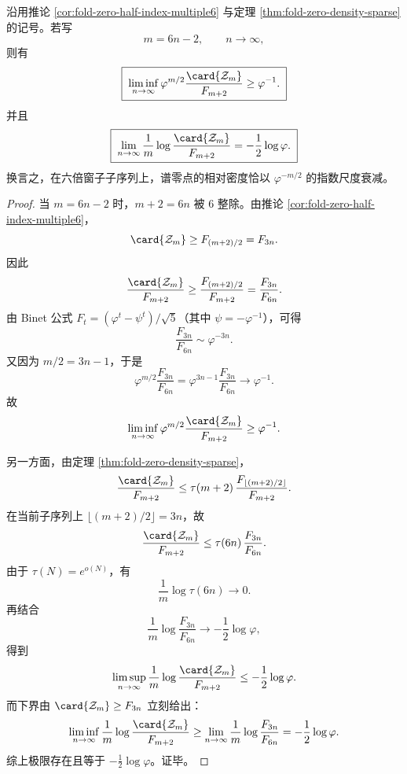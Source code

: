 \begin{theorem}[六倍窗子序列上零点集合密度的精确指数级]\label{thm:fold-zero-window6-density-sharp-exponent}
沿用推论 \ref{cor:fold-zero-half-index-multiple6} 与定理 \ref{thm:fold-zero-density-sparse} 的记号。若写
\[
m=6n-2,
\qquad n\to\infty,
\]
则有
\[
\boxed{\;
\liminf_{n\to\infty}
\varphi^{m/2}\frac{\card{\mathcal{Z}_m}}{F_{m+2}}
\ge
\varphi^{-1}.\;}
\]
并且
\[
\boxed{\;
\lim_{n\to\infty}
\frac{1}{m}\log\frac{\card{\mathcal{Z}_m}}{F_{m+2}}
=
-\frac{1}{2}\log\varphi.\;}
\]
换言之，在六倍窗子子序列上，谱零点的相对密度恰以 \(\varphi^{-m/2}\) 的指数尺度衰减。
\end{theorem}
\begin{proof}
当 \(m=6n-2\) 时，\(m+2=6n\) 被 \(6\) 整除。由推论 \ref{cor:fold-zero-half-index-multiple6}，
\[
\card{\mathcal{Z}_m}\ge F_{(m+2)/2}=F_{3n}.
\]
因此
\[
\frac{\card{\mathcal{Z}_m}}{F_{m+2}}
\ge
\frac{F_{(m+2)/2}}{F_{m+2}}
=
\frac{F_{3n}}{F_{6n}}.
\]
由 Binet 公式 \(F_t=(\varphi^t-\psi^t)/\sqrt5\)（其中 \(\psi=-\varphi^{-1}\)），可得
\[
\frac{F_{3n}}{F_{6n}}
\sim
\varphi^{-3n}.
\]
又因为 \(m/2=3n-1\)，于是
\[
\varphi^{m/2}\frac{F_{3n}}{F_{6n}}
=
\varphi^{3n-1}\frac{F_{3n}}{F_{6n}}
\longrightarrow
\varphi^{-1}.
\]
故
\[
\liminf_{n\to\infty}
\varphi^{m/2}\frac{\card{\mathcal{Z}_m}}{F_{m+2}}
\ge
\varphi^{-1}.
\]

另一方面，由定理 \ref{thm:fold-zero-density-sparse}，
\[
\frac{\card{\mathcal{Z}_m}}{F_{m+2}}
\le
\tau(m+2)\,\frac{F_{\lfloor (m+2)/2\rfloor}}{F_{m+2}}.
\]
在当前子序列上 \(\lfloor (m+2)/2\rfloor=3n\)，故
\[
\frac{\card{\mathcal{Z}_m}}{F_{m+2}}
\le
\tau(6n)\,\frac{F_{3n}}{F_{6n}}.
\]
由于 \(\tau(N)=e^{o(N)}\)，有
\[
\frac{1}{m}\log\tau(6n)\to 0.
\]
再结合
\[
\frac{1}{m}\log\frac{F_{3n}}{F_{6n}}
\longrightarrow
-\frac{1}{2}\log\varphi,
\]
得到
\[
\limsup_{n\to\infty}
\frac{1}{m}\log\frac{\card{\mathcal{Z}_m}}{F_{m+2}}
\le
-\frac{1}{2}\log\varphi.
\]
而下界由
\(
\card{\mathcal{Z}_m}\ge F_{3n}
\)
立刻给出：
\[
\liminf_{n\to\infty}
\frac{1}{m}\log\frac{\card{\mathcal{Z}_m}}{F_{m+2}}
\ge
\lim_{n\to\infty}
\frac{1}{m}\log\frac{F_{3n}}{F_{6n}}
=
-\frac{1}{2}\log\varphi.
\]
综上极限存在且等于 \(-\tfrac12\log\varphi\)。证毕。
\end{proof}
